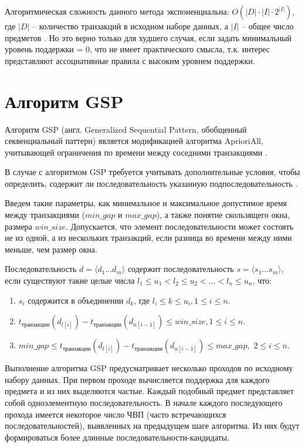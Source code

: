 Алгоритмическая сложность данного метода экспоненциальна: $O(|D| \cdot |I| \cdot 2^{|I|})$, где $|D|$ -- количество транзакций в исходном наборе данных, а $|I|$ -- общее число предметов \cite{Data_mining_book}. Но это верно только для худшего случая, если задать минимальный уровень поддержки = 0, что не имеет практического смысла, т.к. интерес представляют ассоциативные правила с высоким уровнем поддержки.

\section{Алгоритм GSP}
Алгоритм GSP (англ. Generalized Sequential Pattern, обобщенный секвенциальный паттерн) является модификацией алгоритма AprioriAll, учитывающей ограничения по времени между соседними транзакциями \cite{1_, 32_}.

В случае с алгоритмом GSP требуется учитывать дополнительные условия, чтобы определить, содержит ли последовательность указанную подпоследовательность \cite{gsp}.

Введем такие параметры, как минимальное и максимальное допустимое время между транзакциями ($min\_gap$ и $max\_gap$), а также понятие скользящего окна, размера $win\_size$. Допускается, что элемент последовательности может состоять не из одной, а из нескольких транзакций, если разница во времени между ними меньше, чем размер окна.

Последовательность $d = \langle d_1...d_m \rangle$ содержит последовательность
$s = \langle s_1...s_m \rangle$, если существуют такие целые числа $l_1 ≤ u_1 < l_2 ≤ u_2 < ... < l_n ≤ u_n$, что:

\begin{enumerate}
	\item $s_i$ содержится в объединении $d_k$, где $l_i ≤ k ≤ u_i, 1 ≤ i ≤ n$.
	\item $t_{\text{транзакции}}(d_{l[i]}) - t_{\text{транзакции}} (d_{u[i-1]}) ≤ win\_size, 1 ≤ i ≤ n.$
	\item $min\_gap ≤ t_{\text{транзакции}}(d_{l[i]}) - t_{\text{транзакции}}(d_{u[i-1]}) ≤ max\_gap,$ \newline $2≤i≤n.$
\end{enumerate}

Выполнение алгоритма GSP предусматривает несколько проходов по исходному набору данных. При первом проходе вычисляется поддержка для каждого предмета и из них выделяются частые. Каждый подобный предмет представляет собой одноэлементную последовательность. В начале каждого последующего прохода имеется некоторое число ЧВП (часто встречающихся последовательностей), выявленных на предыдущем шаге алгоритма. Из них будут формироваться более длинные последовательности-кандидаты.

